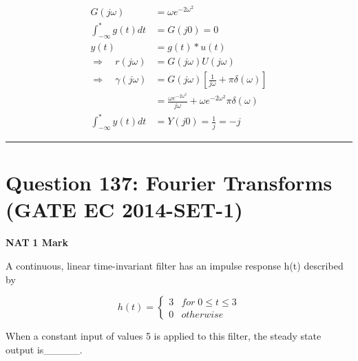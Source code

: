 \documentclass[11pt,a4paper]{article}
\begin{document}
\begin{tcolorbox}[solbox, title=Detailed Solution -- Question 136]
\[
\begin{aligned} G(j \omega) &=\omega e^{-2 \omega^{2}} \\ \int_{-\infty}^{*} g(t) d t &=G(j 0)=0 \\ y(t) &=g(t) * u(t) \\ \Rightarrow \quad r(j \omega) &=G(j \omega) U(j \omega) \\ \Rightarrow \quad \gamma(j \omega) &=G(j \omega)\left[\frac{1}{j \omega}+\pi \delta(\omega)\right] \\ &=\frac{\omega e^{-2 \omega^{2}}}{j \omega}+\omega e^{-2 \omega^{2}} \pi \delta(\omega) \\ \int_{-\infty}^{*} y(t) d t &=Y(j 0)=\frac{1}{j}=-j \end{aligned}
\]
\end{tcolorbox}

\vspace{1.5em}
\hrule
\vspace{1.5em}

\section*{Question 137: Fourier Transforms (GATE EC 2014-SET-1)}
\noindent \textbf{\color{primary}NAT} \hfill \textbf{\color{secondary}1 Mark}


\noindent A continuous, linear time-invariant filter has an impulse response h(t) described
by
 
\[
h(t)=\left\{\begin{matrix} 3 &for \; 0\leq t\leq 3 \\ 0&otherwise \end{matrix}\right.
\]
 
 When a constant input of values 5 is applied to this filter, the steady state output is\_\_\_\_\_.
\end{document}
